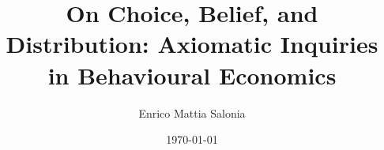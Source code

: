 \documentclass[12pt, a4paper]{report}
\title{On Choice, Belief, and Distribution: Axiomatic Inquiries in Behavioural Economics}
\author{Enrico Mattia Salonia}
\date{\today}  %
\begin{document}

\begin{titlepage}
	\centering
	\makeatletter                   %
	{\LARGE\bfseries \@title\par}\vspace{2cm}


	{\Large\bfseries \@author\par}\vspace{0.5cm}  %

	{\@date}                        %
	\makeatother                    %
\end{titlepage}


\cleardoublepage

\setcounter{page}{2} %
\tableofcontents
\cleardoublepage








\appendix








\end{document}
